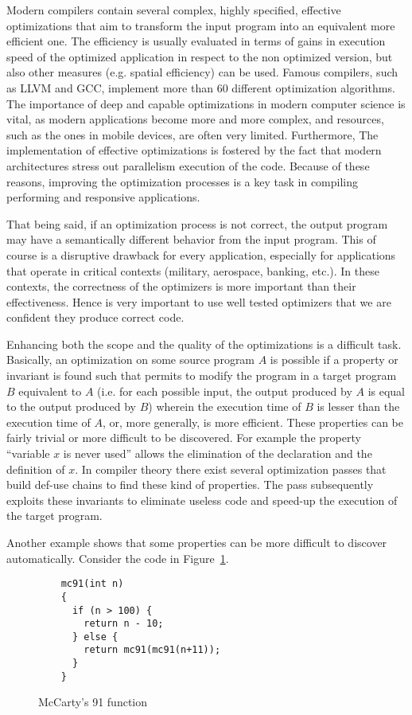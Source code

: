 
Modern compilers contain several complex, highly specified, effective optimizations that aim to transform the input program into an equivalent more efficient one. The efficiency is usually evaluated in terms of gains in execution speed of the optimized application in respect to the non optimized version, but also other measures (e.g. spatial efficiency) can be used. Famous compilers, such as LLVM and GCC, implement more than 60 different optimization algorithms. The importance of deep and capable optimizations in modern computer science is vital, as modern applications become more and more complex, and resources, such as the ones in mobile devices, are often very limited. Furthermore, The implementation of effective optimizations is fostered by the fact that modern architectures stress out parallelism execution of the code. Because of these reasons, improving the optimization processes is a key task in compiling performing and responsive applications.

That being said, if an optimization process is not correct, the output program may have a semantically different behavior from the input program. This of course is a disruptive drawback for every application, especially for applications that operate in critical contexts (military, aerospace, banking, etc.). In these contexts, the correctness of the optimizers is more important than their effectiveness. Hence is very important to use well tested optimizers that we are confident they produce correct code.

Enhancing both the scope and the quality of the optimizations is a difficult task. Basically, an optimization on some source program $A$ is possible if a property or invariant is found such that permits to modify the program in a target program $B$ equivalent to $A$ (i.e. for each possible input, the output produced by $A$ is equal to the output produced by $B$) wherein the execution time of $B$ is lesser than the execution time of $A$, or, more generally, is more efficient. These properties can be fairly trivial or more difficult to be discovered.
For example the property ``variable $x$ is never used'' allows the elimination of the declaration and the definition of $x$. In compiler theory there exist several optimization passes that build def-use chains to find these kind of properties. The pass subsequently exploits these invariants to eliminate useless code and speed-up the execution of the target program.

Another example shows that some properties can be more difficult to discover automatically. Consider the code in Figure~\ref{fig:mccarty}.
\begin{figure}[b]
  \begin{mdframed}
  \centering
  \begin{lstlisting}
    mc91(int n)
    {
      if (n > 100) {
        return n - 10;
      } else {
        return mc91(mc91(n+11));
      }
    }
    \end{lstlisting}
  \end{mdframed}
  \caption{McCarty's 91 function}
  \label{fig:mccarty}
\end{figure}

